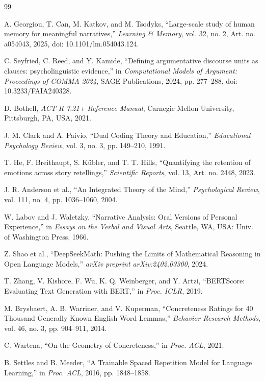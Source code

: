 \documentclass[conference]{IEEEtran}
\begin{document}
\balance
\small
\begin{thebibliography}{99}

A. Georgiou, T. Can, M. Katkov, and M. Tsodyks,
``Large-scale study of human memory for meaningful narratives,''
\emph{Learning \& Memory}, vol. 32, no. 2, Art. no. a054043, 2025,
doi: 10.1101/lm.054043.124.

C. Seyfried, C. Reed, and Y. Kamide,
``Defining argumentative discourse units as clauses: psycholinguistic evidence,''
in \emph{Computational Models of Argument: Proceedings of COMMA 2024},
SAGE Publications, 2024, pp. 277--288,
doi: 10.3233/FAIA240328.

D. Bothell,
\emph{ACT-R 7.21+ Reference Manual},
Carnegie Mellon University,
Pittsburgh, PA, USA,
2021.

J. M. Clark and A. Paivio,
``Dual Coding Theory and Education,''
\emph{Educational Psychology Review},
vol. 3, no. 3, pp. 149--210, 1991.

T. He, F. Breithaupt, S. Kübler, and T. T. Hills,
``Quantifying the retention of emotions across story retellings,''
\emph{Scientific Reports},
vol. 13, Art. no. 2448, 2023.

J. R. Anderson et al.,
``An Integrated Theory of the Mind,''
\emph{Psychological Review},
vol. 111, no. 4, pp. 1036--1060, 2004.

W. Labov and J. Waletzky,
``Narrative Analysis: Oral Versions of Personal Experience,''
in \emph{Essays on the Verbal and Visual Arts},
Seattle, WA, USA: Univ. of Washington Press, 1966.

Z. Shao et al.,
``DeepSeekMath: Pushing the Limits of Mathematical Reasoning in Open Language Models,''
\emph{arXiv preprint arXiv:2402.03300},
2024.

T. Zhang, V. Kishore, F. Wu, K. Q. Weinberger, and Y. Artzi,
``BERTScore: Evaluating Text Generation with BERT,''
in \emph{Proc. ICLR},
2019.

M. Brysbaert, A. B. Warriner, and V. Kuperman,
``Concreteness Ratings for 40 Thousand Generally Known English Word Lemmas,''
\emph{Behavior Research Methods},
vol. 46, no. 3, pp. 904--911, 2014.

C. Wartena,
``On the Geometry of Concreteness,''
in \emph{Proc. ACL},
2021.

B. Settles and B. Meeder,
``A Trainable Spaced Repetition Model for Language Learning,''
in \emph{Proc. ACL},
2016, pp. 1848--1858.


\end{thebibliography}
\end{document}
